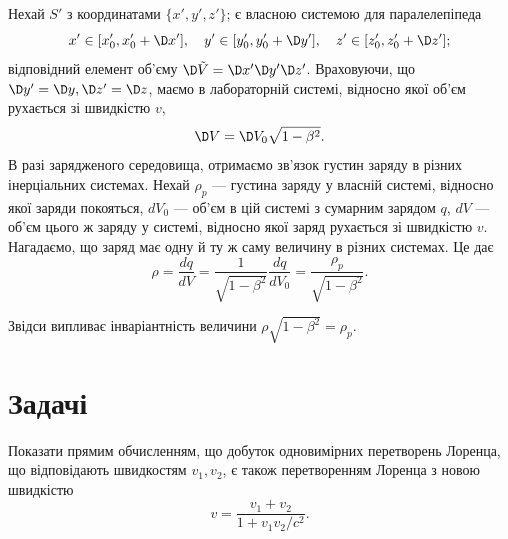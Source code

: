 Нехай $S'$ з координатами $\{x',y',z'\}$; є власною системою для паралелепіпеда
\begin{equation*}
    x'\in [x'_0,x'_0+\D x'],\quad y'\in [y'_0,y'_0+\D y'],\quad z'\in [z'_0,z'_0+\D z'];
\end{equation*}
відповідний елемент об'єму $\D \tilde{V}=\D x'\D y'\D z'$. Враховуючи, що $\D y'=\D y, \D
z'=\D z$, маємо в лабораторній системі, відносно якої об'єм рухається зі швидкістю $v$,
\begin{equation} \label{eq:LT_1_18}
	\D V=\D V_0\sqrt{1-\beta^2}.
\end{equation}
В разі зарядженого середовища, отримаємо зв'язок густин заряду в різних інерціальних системах. Нехай $\rho_p$ ---
густина заряду у власній системі, відносно якої заряди покояться, $dV_0$ --- об'єм в цій системі з сумарним зарядом $q$,
$dV$  ---  об'єм цього ж заряду у системі, відносно якої заряд рухається зі швидкістю $v$. Нагадаємо, що заряд має одну
й ту ж саму величину в різних системах. Це дає
\begin{equation}\label{eq:charge_density_transform}
    \rho=\frac{dq}{dV}=\frac{1}{\sqrt{1-\beta^2}}\frac{dq}{dV_0}=\frac{\rho_p}{\sqrt{1-\beta^2}} .
\end{equation}


Звідси випливає інваріантність величини $\rho\sqrt{1-\beta^2}=\rho_p$.


\section*{Задачі}

\begin{problem}
Показати прямим обчисленням, що добуток одновимірних перетворень Лоренца, що відповідають швидкостям $v_{1}, v_{2}$, є
також перетворенням Лоренца з новою швидкістю
\[
v = \frac{v_{1} + v_{2}}{1 + v_{1}v_{2}/c^{2}}.
\]
\end{problem}

